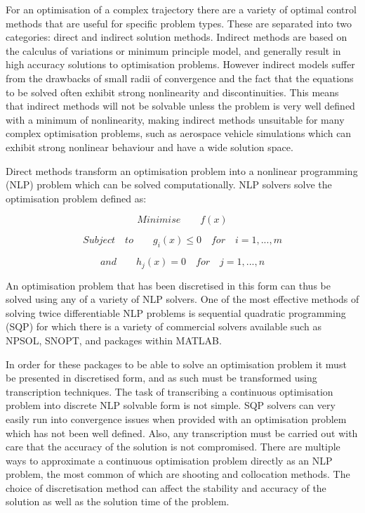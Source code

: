 For an optimisation of a complex trajectory there are a variety of optimal control methods that are useful for specific problem types. These are separated into two categories: direct and indirect solution methods. Indirect methods are based on the calculus of variations or minimum principle model, and generally result in high accuracy solutions to optimisation problems\cite{Bulirsch1993}. However indirect models suffer from the drawbacks of small radii of convergence and the fact that the equations to be solved often exhibit strong nonlinearity and discontinuities. This means that indirect methods will not be solvable unless the problem is very well defined with a minimum of nonlinearity, making indirect methods unsuitable for many complex optimisation problems, such as aerospace vehicle simulations which can exhibit strong nonlinear behaviour and have a wide solution space. 

Direct methods transform an optimisation problem into a nonlinear programming (NLP) problem which can be solved computationally\cite{Stryk1992}. NLP solvers solve the optimisation problem defined as\cite{Bazaraa2013}:

\begin{equation}
Minimise \qquad f(x)
\end{equation}

\begin{equation}
Subject \quad to \qquad g_i(x)\leq0 \quad for \quad i=1,...,m
\end{equation}

\begin{equation}
and \qquad h_j(x) = 0 \quad for \quad j=1,...,n
\end{equation}

An optimisation problem that has been discretised in this form can thus be solved using any of a variety of NLP solvers. One of the most effective methods of solving twice differentiable NLP problems is sequential quadratic programming (SQP)\cite{Boggs2000} for which there is a variety of commercial solvers available such as NPSOL, SNOPT, and packages within MATLAB. 

In order for these packages to be able to solve an optimisation problem it must be presented in discretised form, and as such must be transformed using transcription techniques\cite{Kelly2015}. The task of transcribing a continuous optimisation problem into discrete NLP solvable form is not simple. SQP solvers can very easily run into convergence issues when provided with an optimisation problem which has not been well defined. Also, any transcription must be carried out with care that the accuracy of the solution is not compromised. 
There are multiple ways to approximate a continuous optimisation problem directly as an NLP problem, the most common of which are shooting and collocation methods. The choice of discretisation method can affect the stability and accuracy of the solution as well as the solution time of the problem. 

